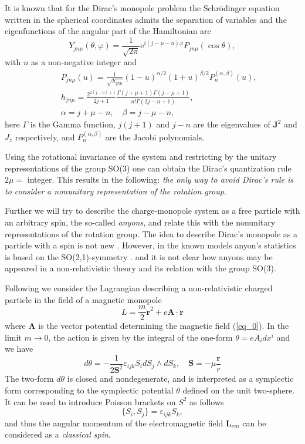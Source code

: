 \documentclass[a4paper,twocolumn,aps,showpacs,showkeys]{revtex4}
\begin{document}
It is known that for the Dirac's monopole problem the Schr\"odinger
equation written in the spherical coordinates admits the separation of
variables and the eigenfunctions of the angular part of the Hamiltonian are
\cite{Wu2}
\begin{equation}
Y_{jn\mu}(\theta, \varphi) = \frac{1}{\sqrt{2\pi}}\mbox{e}^{i(j -
\mu - n)\varphi}P_{jn\mu}(\cos\theta),
\label{eq2}
\end{equation}
with $n$ as a non-negative integer and
\begin{eqnarray}
&&P_{jn\mu}(u) = \frac{1}{\sqrt{h_{jn\mu}}}(1 -
u)^{\alpha/2}(1 + u)^{\beta/2}P_{n}^{(\alpha, \beta)}(u),\nonumber \\
&&h_{jn\mu} = \frac{2^{2(j - n) + 1}}{2j + 1}\frac{\Gamma(j + \mu
+ 1)\Gamma(j - \mu + 1)}{n!\Gamma(2j - n + 1)}, \nonumber \\
&&\alpha = j + \mu - n, \quad\beta = j - \mu - n, \nonumber
\label{eq3}
\end{eqnarray}
here $\Gamma$ is the Gamma function, $j(j + 1)$ and $j - n$ are the
eigenvalues of ${\mathbf J}^2$ and $J_z$ respectively, and $P_{n}^{(\alpha,
\beta)}$ are the Jacobi polynomials.

Using the rotational invariance of the system and restricting by
the unitary representations of the group SO(3) one can obtain the
Dirac's quantization rule $2\mu=$ integer. This results in the
following: {\it the only way to avoid Dirac's rule is to consider
a nonunitary representation of the rotation group}.

Further we will try to describe the charge-monopole system as a free
particle with an arbitrary spin, the so-called {\it anyons}, and relate
this with the nonunitary representations of the rotation group. The idea
to describe Dirac's monopole as a particle with a spin is not new
\cite{Gol,Gol2,Ply}. However, in the known models anyon's statistics is
based on the SO(2,1)-symmetry \cite{Ply,Jan}. and it is not clear how
anyons may be appeared in a non-relativistic theory and its relation with
the group SO(3).

Following \cite{Ply} we consider the Lagrangian describing a
non-relativistic charged particle in the field of a magnetic monopole
\[
L= \frac{m}{2}\dot{\mathbf r}^2 + e{\mathbf A}\cdot\dot{\mathbf r}
\]
where $\mathbf A$ is the vector potential determining the magnetic field
(\ref{eq_0}). In the limit $m \rightarrow 0$, the action is given by the
integral of the one-form $\theta = eA_i dx^i$ and we have
\begin{equation}
d\theta = -\frac{1}{2{\mathbf
S}^2}\varepsilon_{ijk}S_idS_j\wedge{dS_k}, \quad {\mathbf S}
= -\mu\frac{\mathbf r}{r}
\label{eq4}
\end{equation}
The two-form $d\theta$ is closed and nondegenerate, and is interpreted as
a symplectic form corresponding to the symplectic potential $\theta$
defined on the unit two-sphere. It can be used to introduce
Poisson brackets on $S^2$ as follows
\begin{equation}
\{S_i, S_j\} = \varepsilon_{ijk}S_k,
\label{eq5}
\end{equation}
and thus the angular momentum of the electromagnetic field
$\mathbf L_{em}$ can be considered as a {\it classical spin}.
\end{document}
